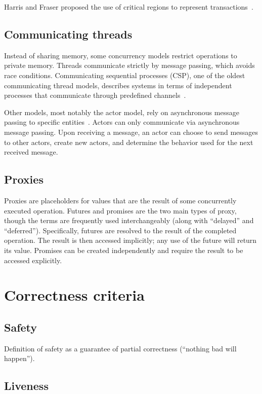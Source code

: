 \documentclass{sig-alternate}
\begin{document}
Harris and Fraser proposed the use of critical regions to represent transactions~\cite{Harris2014}.

\subsection{Communicating threads}

Instead of sharing memory, some concurrency models restrict operations to private memory. Threads communicate strictly by message passing, which avoids race conditions. Communicating sequential processes (CSP), one of the oldest communicating thread models, describes systems in terms of independent processes that communicate through predefined channels~\cite{Hoare1978}.

Other models, most notably the actor model, rely on asynchronous message passing to specific entities~\cite{Agha1986}. Actors can only communicate via asynchronous message passing. Upon receiving a message, an actor can choose to send messages to other actors, create new actors, and determine the behavior used for the next received message.

\subsection{Proxies}

Proxies are placeholders for values that are the result of some concurrently executed operation. Futures and promises are the two main types of proxy, though the terms are frequently used interchangeably (along with ``delayed'' and ``deferred''). Specifically, futures are resolved to the result of the completed operation. The result is then accessed implicitly; any use of the future will return its value. Promises can be created independently and require the result to be accessed explicitly.

\section{Correctness criteria}

\subsection{Safety}

Definition of safety as a guarantee of partial correctness (``nothing bad will happen'').

\subsection{Liveness}
\end{document}
